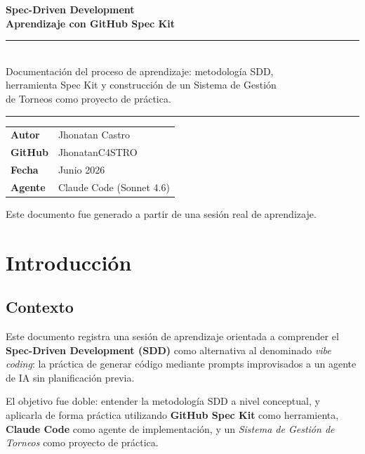 \documentclass[12pt, a4paper]{report}
\begin{document}
\begin{titlepage}
  \centering
  \vspace*{3cm}
  {\Large\bfseries Spec-Driven Development}\\[0.4cm]
  {\large\bfseries Aprendizaje con GitHub Spec Kit}\\[2cm]
  \rule{\textwidth}{0.4pt}\\[0.5cm]
  {\normalsize
    Documentaci\'on del proceso de aprendizaje: metodolog\'ia SDD,\\
    herramienta Spec Kit y construcci\'on de un Sistema de Gesti\'on\\
    de Torneos como proyecto de pr\'actica.
  }\\[0.4cm]
  \rule{\textwidth}{0.4pt}
  \vspace{2cm}
  \begin{tabular}{ll}
    \textbf{Autor}   & Jhonatan Castro \\[4pt]
    \textbf{GitHub}  & JhonatanC4STRO \\[4pt]
    \textbf{Fecha}   & Junio 2026 \\[4pt]
    \textbf{Agente}  & Claude Code (Sonnet 4.6) \\
  \end{tabular}
  \vfill
  {\small Este documento fue generado a partir de una sesi\'on real de aprendizaje.}
\end{titlepage}

\tableofcontents
\newpage

\chapter{Introducci\'on}

\section{Contexto}

Este documento registra una sesi\'on de aprendizaje orientada a comprender
el \textbf{Spec-Driven Development (SDD)} como alternativa al denominado
\textit{vibe coding}: la pr\'actica de generar c\'odigo mediante prompts
improvisados a un agente de IA sin planificaci\'on previa.

El objetivo fue doble: entender la metodolog\'ia SDD a nivel conceptual,
y aplicarla de forma pr\'actica utilizando \textbf{GitHub Spec Kit} como
herramienta, \textbf{Claude Code} como agente de implementaci\'on, y un
\textit{Sistema de Gesti\'on de Torneos} como proyecto de pr\'actica.
\end{document}
